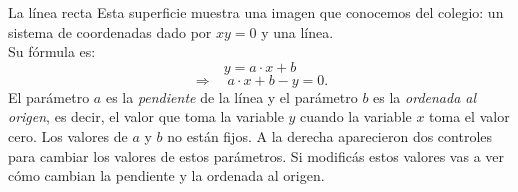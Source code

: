 \begin{surferPage}{La línea recta}
Esta superficie muestra una imagen que conocemos del colegio: un sistema de coordenadas dado por $xy=0$  y una l\'inea.\\
Su f\'ormula es:
\[y=a\cdot x + b\]
\[ \Rightarrow \quad a\cdot x +b -y=0.\]
El par\'ametro $a$ es la {\it pendiente} de la l\'inea y el par\'ametro $b$ es la {\it ordenada al origen}, es decir, el valor que toma la variable $y$ cuando la variable $x$ toma el valor cero.
\newline \newline
Los valores de $a$ y $b$ no est\'an fijos. A la derecha aparecieron dos controles para cambiar los valores de estos par\'ametros. Si modific\'as estos valores vas a ver c\'omo cambian la pendiente y la ordenada al origen.
\end{surferPage}
